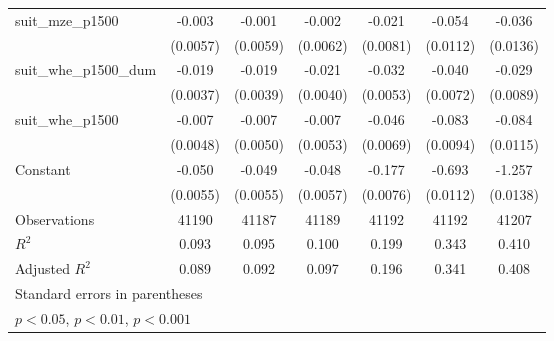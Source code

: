 {\begin{tabular}{l*{6}{c}}
suit\_mze\_p1500      &      -0.003         &      -0.001         &      -0.002         &      -0.021\sym{**} &      -0.054\sym{***}&      -0.036\sym{**} \\
                    &    (0.0057)         &    (0.0059)         &    (0.0062)         &    (0.0081)         &    (0.0112)         &    (0.0136)         \\
\addlinespace
suit\_whe\_p1500\_dum  &      -0.019\sym{***}&      -0.019\sym{***}&      -0.021\sym{***}&      -0.032\sym{***}&      -0.040\sym{***}&      -0.029\sym{**} \\
                    &    (0.0037)         &    (0.0039)         &    (0.0040)         &    (0.0053)         &    (0.0072)         &    (0.0089)         \\
\addlinespace
suit\_whe\_p1500      &      -0.007         &      -0.007         &      -0.007         &      -0.046\sym{***}&      -0.083\sym{***}&      -0.084\sym{***}\\
                    &    (0.0048)         &    (0.0050)         &    (0.0053)         &    (0.0069)         &    (0.0094)         &    (0.0115)         \\
\addlinespace
Constant            &      -0.050\sym{***}&      -0.049\sym{***}&      -0.048\sym{***}&      -0.177\sym{***}&      -0.693\sym{***}&      -1.257\sym{***}\\
                    &    (0.0055)         &    (0.0055)         &    (0.0057)         &    (0.0076)         &    (0.0112)         &    (0.0138)         \\
\midrule
Observations        &       41190         &       41187         &       41189         &       41192         &       41192         &       41207         \\
\(R^{2}\)           &       0.093         &       0.095         &       0.100         &       0.199         &       0.343         &       0.410         \\
Adjusted \(R^{2}\)  &       0.089         &       0.092         &       0.097         &       0.196         &       0.341         &       0.408         \\
\bottomrule
\multicolumn{7}{l}{\footnotesize Standard errors in parentheses}\\
\multicolumn{7}{l}{\footnotesize \sym{*} \(p<0.05\), \sym{**} \(p<0.01\), \sym{***} \(p<0.001\)}\\
\end{tabular}
}
